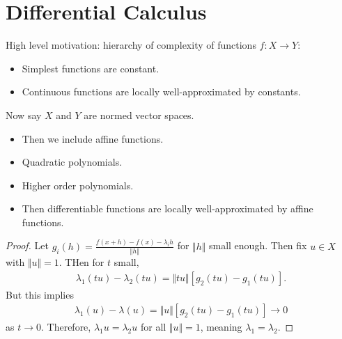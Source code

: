 \documentclass{report}
\begin{document}
\chapter{Differential Calculus}
High level motivation: hierarchy of complexity of functions $f: X \to Y$:
\begin{itemize}
    \item Simplest functions are constant.
    \item Continuous functions are locally well-approximated by constants.
\end{itemize}
Now say $X$ and $Y$ are normed vector spaces. 
\begin{itemize}
    \item Then we include affine functions.
    \item Quadratic polynomials.
    \item Higher order polynomials.
    \item Then differentiable functions are locally well-approximated by affine functions.
\end{itemize}
\begin{proof}
    Let $g_i(h) = \frac{f(x + h) - f(x) - \lambda_i h}{\Vert h \Vert}$ for $\Vert h \Vert$ small enough. Then fix $u \in X$ with $\Vert u \Vert =1 $. THen for $t$ small, 
    \begin{align*}
        \lambda_1(tu) - \lambda_2(tu) = \Vert tu\Vert [g_2(tu) - g_1(tu)].
    \end{align*}
    But this implies 
    \begin{align*}
        \lambda_1(u) - \lambda(u) = \Vert u\Vert [g_2(tu) - g_1(tu)] \to 0
    \end{align*}
    as $t \to 0$. Therefore, $\lambda_1 u = \lambda_2 u$ for all $\Vert u \Vert = 1$, meaning $\lambda_1 = \lambda_2$.
\end{proof}
\end{document}
